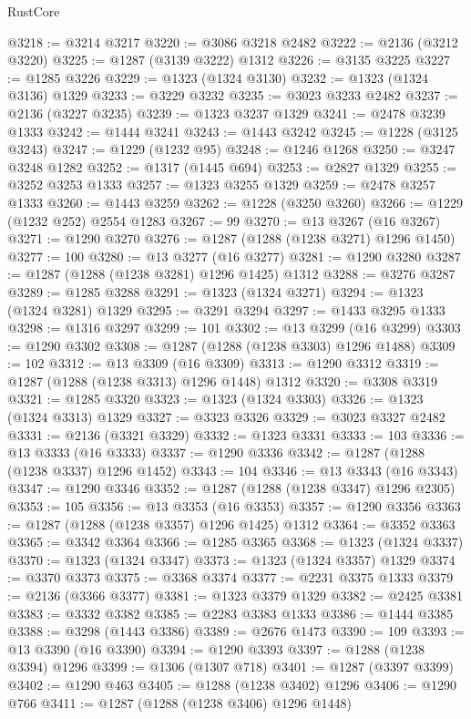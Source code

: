 \begin{lexlean}{RustCore}
\begin{coremodule}
@3218 := @3214 @3217
@3220 := @3086 @3218 @2482
@3222 := @2136 (@3212 @3220)
@3225 := @1287 (@3139 @3222) @1312
@3226 := @3135 @3225
@3227 := @1285 @3226
@3229 := @1323 (@1324 @3130)
@3232 := @1323 (@1324 @3136) @1329
@3233 := @3229 @3232
@3235 := @3023 @3233 @2482
@3237 := @2136 (@3227 @3235)
@3239 := @1323 @3237 @1329
@3241 := @2478 @3239 @1333
@3242 := @1444 @3241
@3243 := @1443 @3242
@3245 := @1228 (@3125 @3243)
@3247 := @1229 (@1232 @95)
@3248 := @1246 @1268
@3250 := @3247 @3248 @1282
@3252 := @1317 (@1445 @694)
@3253 := @2827 @1329
@3255 := @3252 @3253 @1333
@3257 := @1323 @3255 @1329
@3259 := @2478 @3257 @1333
@3260 := @1443 @3259
@3262 := @1228 (@3250 @3260)
@3266 := @1229 (@1232 @252) @2554 @1283
@3267 := 99
@3270 := @13 @3267 (@16 @3267)
@3271 := @1290 @3270
@3276 := @1287 (@1288 (@1238 @3271) @1296 @1450)
@3277 := 100
@3280 := @13 @3277 (@16 @3277)
@3281 := @1290 @3280
@3287 := @1287 (@1288 (@1238 @3281) @1296 @1425) @1312
@3288 := @3276 @3287
@3289 := @1285 @3288
@3291 := @1323 (@1324 @3271)
@3294 := @1323 (@1324 @3281) @1329
@3295 := @3291 @3294
@3297 := @1433 @3295 @1333
@3298 := @1316 @3297
@3299 := 101
@3302 := @13 @3299 (@16 @3299)
@3303 := @1290 @3302
@3308 := @1287 (@1288 (@1238 @3303) @1296 @1488)
@3309 := 102
@3312 := @13 @3309 (@16 @3309)
@3313 := @1290 @3312
@3319 := @1287 (@1288 (@1238 @3313) @1296 @1448) @1312
@3320 := @3308 @3319
@3321 := @1285 @3320
@3323 := @1323 (@1324 @3303)
@3326 := @1323 (@1324 @3313) @1329
@3327 := @3323 @3326
@3329 := @3023 @3327 @2482
@3331 := @2136 (@3321 @3329)
@3332 := @1323 @3331
@3333 := 103
@3336 := @13 @3333 (@16 @3333)
@3337 := @1290 @3336
@3342 := @1287 (@1288 (@1238 @3337) @1296 @1452)
@3343 := 104
@3346 := @13 @3343 (@16 @3343)
@3347 := @1290 @3346
@3352 := @1287 (@1288 (@1238 @3347) @1296 @2305)
@3353 := 105
@3356 := @13 @3353 (@16 @3353)
@3357 := @1290 @3356
@3363 := @1287 (@1288 (@1238 @3357) @1296 @1425) @1312
@3364 := @3352 @3363
@3365 := @3342 @3364
@3366 := @1285 @3365
@3368 := @1323 (@1324 @3337)
@3370 := @1323 (@1324 @3347)
@3373 := @1323 (@1324 @3357) @1329
@3374 := @3370 @3373
@3375 := @3368 @3374
@3377 := @2231 @3375 @1333
@3379 := @2136 (@3366 @3377)
@3381 := @1323 @3379 @1329
@3382 := @2425 @3381
@3383 := @3332 @3382
@3385 := @2283 @3383 @1333
@3386 := @1444 @3385
@3388 := @3298 (@1443 @3386)
@3389 := @2676 @1473
@3390 := 109
@3393 := @13 @3390 (@16 @3390)
@3394 := @1290 @3393
@3397 := @1288 (@1238 @3394) @1296
@3399 := @1306 (@1307 @718)
@3401 := @1287 (@3397 @3399)
@3402 := @1290 @463
@3405 := @1288 (@1238 @3402) @1296
@3406 := @1290 @766
@3411 := @1287 (@1288 (@1238 @3406) @1296 @1448)

\end{coremodule}
\end{lexlean}
